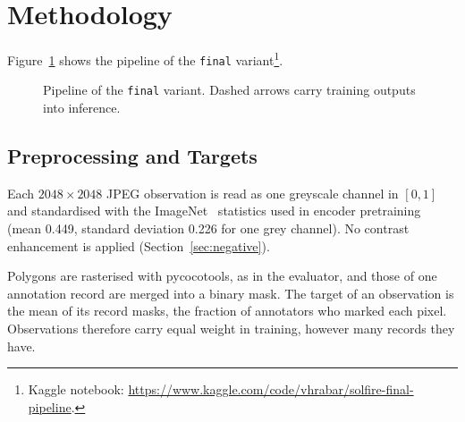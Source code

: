 \documentclass[sigconf,pbalance]{acmart}
\begin{document}
\section{Methodology}\label{sec:methodology}
    Figure~\ref{fig:pipeline} shows the pipeline of the \texttt{final} variant\footnote{Kaggle notebook: \url{https://www.kaggle.com/code/vhrabar/solfire-final-pipeline}.}.

    \begin{figure}[t]
        \centering
        
        \caption{Pipeline of the \texttt{final} variant.
        Dashed arrows carry training outputs into inference.}\label{fig:pipeline}
    \end{figure}

    \subsection{Preprocessing and Targets}\label{subsec:preprocessing}
    Each $2048\times2048$ JPEG observation is read as one greyscale channel in $[0,1]$ and standardised with the ImageNet~\cite{deng2009imagenet} statistics used in encoder pretraining (mean 0.449, standard deviation 0.226 for one grey channel).
    No contrast enhancement is applied (Section~\ref{sec:negative}).

    Polygons are rasterised with pycocotools, as in the evaluator, and those of one annotation record are merged into a binary mask.
    The target of an observation is the mean of its record masks, the fraction of annotators who marked each pixel.
    Observations therefore carry equal weight in training, however many records they have.
\end{document}
